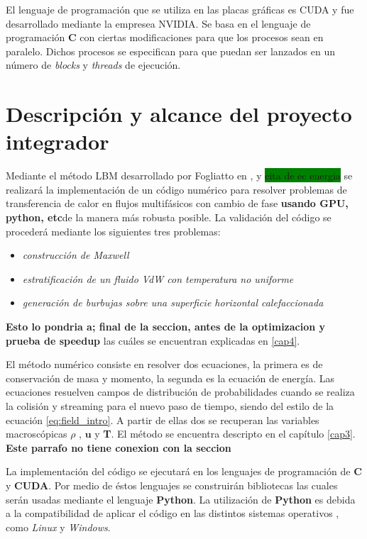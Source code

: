 El lenguaje de programación que se utiliza en las placas gráficas es CUDA y fue desarrollado mediante la empresea NVIDIA. Se basa en el lenguaje de programación \textbf{C} con ciertas modificaciones para que los procesos sean en paralelo. Dichos procesos se especifican para que puedan ser lanzados en un número de \textit{blocks} y \textit{threads} de ejecución.






\section{Descripción y alcance del proyecto integrador}

Mediante el método LBM desarrollado por Fogliatto en \cite{fogliatto2018modelado}, \cite{fogliatto2019simulation} y \colorbox{green}{cita de ec energia} se realizará la implementación de un código numérico para resolver problemas de transferencia de calor en flujos multifásicos con cambio de fase \textbf{usando GPU, python, etc}de la manera más robusta posible. 
La validación del código se procederá mediante los siguientes tres problemas:
\begin{itemize}
	\item \textit{construcción de Maxwell}
	\item \textit{estratificación de un fluido VdW con temperatura no uniforme}
	\item \textit{generación de burbujas sobre una superficie horizontal calefaccionada}
\end{itemize} 

\textbf{Esto lo pondria a; final de la seccion, antes de la optimizacion y prueba de speedup}
las cuáles se encuentran explicadas en \ref{cap4}.

El método numérico consiste en resolver dos ecuaciones, la primera es de conservación de masa y momento, la segunda es la ecuación de energía. Las ecuaciones resuelven campos de distribución de probabilidades cuando se realiza la colisión y streaming para el nuevo paso de tiempo, siendo del estilo de la ecuación \ref{eq:field_intro}. A partir de ellas dos se recuperan las variables macroscópicas $\rho$ , $\mathbf{u}$ y \textbf{T}. El método se encuentra descripto en el capítulo \ref{cap3}. \textbf{Este parrafo no tiene conexion con la seccion}

La implementación del código se ejecutará en los lenguajes de programación de \textbf{C} y \textbf{CUDA}. Por medio de éstos lenguajes se construirán bibliotecas las cuales serán usadas mediante el lenguaje \textbf{Python}. La utilización de \textbf{Python} es debida a la compatibilidad de aplicar  el código en las distintos sistemas operativos , como \textit{Linux} y \textit{Windows}.


